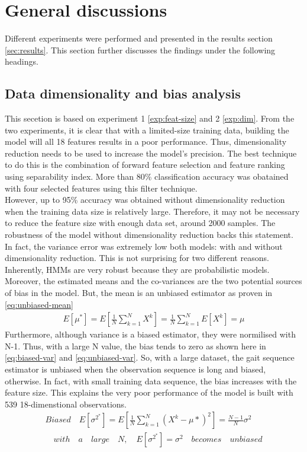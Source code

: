 \chapter{General discussions}

Different experiments were performed and presented in the results section \ref{sec:results}. This section further discusses the findings under the following headings.

\section{Data dimensionality and bias analysis}

This secetion is based on experiment 1 \ref{exp:feat-size} and 2 \ref{exp:dim}.
From the two experiments, it is clear that with a limited-size training data, building the model will all 18 features results in a poor performance. Thus, dimensionality reduction needs to be used to increase the model's precision. The best technique to do this is the combination of forward feature selection and feature ranking using separability index. More than 80\% classification accuracy was obatained with four selected features using this filter technique.\\
However, up to 95\% accuracy was obtained without dimensionality reduction when the training data size is relatively large. Therefore, it may not be necessary to reduce the feature size with enough data set, around 2000 samples. The robustness of the model without dimensionality reduction backs this statement. In fact, the variance error was extremely low both models: with and without dimensionality reduction. This is not surprising for two different reasons. Inherently, HMMs are very robust because they are probabilistic models. Moreover, the estimated means and the co-variances are the two potential sources of bias in the model. But, the mean is an unbiased estimator as proven in \ref{eq:unbiased-mean} 
\begin{align} 
	E[\mu^*] = E[\frac{1}{N}\sum_{k=1}^{N}X^k] = \frac{1}{N}\sum_{k=1}^{N}E[X^k]=\mu \label{eq:unbiased-mean}
\end{align} 
Furthermore, although variance is a biased estimator, they were normilised with N-1. Thus, with a large N value, the bias tends to zero as shown here in \ref{eq:biased-var} and \ref{eq:unbiased-var}. So, with a large dataset, the gait sequence estimator is unbiased when the observation sequence is long and biased, otherwise. In fact, with small training data sequence, the bias increases with the feature size. This explains the very poor performance of the model is built with 539 18-dimenstional observations.
 \begin{align} 
	Biased \quad	E[\sigma^{2^*}] = E[\frac{1}{N}\sum_{k=1}^{N}(X^k - \mu*)^2] = \frac{N - 1}{N}\sigma^2 \label{eq:biased-var}\\
 \quad with \quad a \quad large \quad N, \quad E[\sigma^{2^*}] = \sigma^2 \label{eq:unbiased-var} \quad becomes \quad unbiased
 \end{align}

